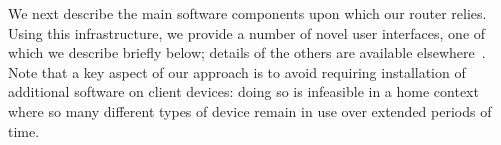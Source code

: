 

                                                                     

  We next describe the main software components upon which our router relies.
  Using this infrastructure, we provide a number of novel user interfaces, one
  of which we describe briefly below; details of the others are available
  elsewhere~\cite{mortier11:_suppor_novel_home_networ_manag}.  Note that a key
  aspect of our approach is to avoid requiring installation of additional
  software on client devices: doing so is infeasible in a home context where so
  many different types of device remain in use over extended periods of time.



